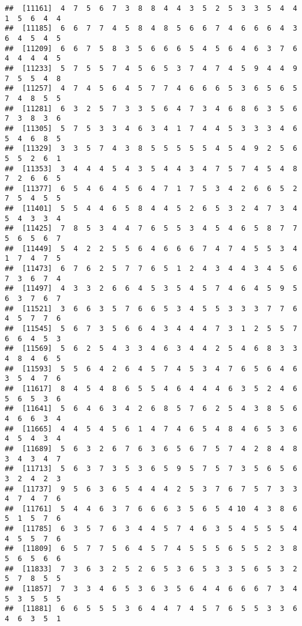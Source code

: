 \documentclass[
]{book}
\begin{document}
\begin{verbatim}
##  [11161]  4  7  5  6  7  3  8  8  4  4  3  5  2  5  3  3  5  4  4  1  5  6  4  4
##  [11185]  6  6  7  7  4  5  8  4  8  5  6  6  7  4  6  6  6  4  3  6  4  5  4  5
##  [11209]  6  6  7  5  8  3  5  6  6  6  5  4  5  6  4  6  3  7  6  4  4  4  4  5
##  [11233]  5  7  5  5  7  4  5  6  5  3  7  4  7  4  5  9  4  4  9  7  5  5  4  8
##  [11257]  4  7  4  5  6  4  5  7  7  4  6  6  6  5  3  6  5  6  5  7  4  8  5  5
##  [11281]  6  3  2  5  7  3  3  5  6  4  7  3  4  6  8  6  3  5  6  7  3  8  3  6
##  [11305]  5  7  5  3  3  4  6  3  4  1  7  4  4  5  3  3  3  4  6  5  4  6  8  5
##  [11329]  3  3  5  7  4  3  8  5  5  5  5  5  4  5  4  9  2  5  6  5  5  2  6  1
##  [11353]  3  4  4  4  5  4  3  5  4  4  3  4  7  5  7  4  5  4  8  7  2  6  6  5
##  [11377]  6  5  4  6  4  5  6  4  7  1  7  5  3  4  2  6  6  5  2  7  5  4  5  5
##  [11401]  5  5  4  4  6  5  8  4  4  5  2  6  5  3  2  4  7  3  4  5  4  3  3  4
##  [11425]  7  8  5  3  4  4  7  6  5  5  3  4  5  4  6  5  8  7  7  5  6  5  6  7
##  [11449]  5  4  2  2  5  5  6  4  6  6  6  7  4  7  4  5  5  3  4  1  7  4  7  5
##  [11473]  6  7  6  2  5  7  7  6  5  1  2  4  3  4  4  3  4  5  6  7  3  6  7  4
##  [11497]  4  3  3  2  6  6  4  5  3  5  4  5  7  4  6  4  5  9  5  6  3  7  6  7
##  [11521]  3  6  6  3  5  7  6  6  5  3  4  5  5  3  3  3  7  7  6  4  5  7  7  6
##  [11545]  5  6  7  3  5  6  6  4  3  4  4  4  7  3  1  2  5  5  7  6  6  4  5  3
##  [11569]  5  6  2  5  4  3  3  4  6  3  4  4  2  5  4  6  8  3  3  4  8  4  6  5
##  [11593]  5  5  6  4  2  6  4  5  7  4  5  3  4  7  6  5  6  4  6  3  5  4  7  6
##  [11617]  8  4  5  4  8  6  5  5  4  6  4  4  4  6  3  5  2  4  6  5  6  5  3  6
##  [11641]  5  6  4  6  3  4  2  6  8  5  7  6  2  5  4  3  8  5  6  4  6  6  3  4
##  [11665]  4  4  5  4  5  6  1  4  7  4  6  5  4  8  4  6  5  3  6  4  5  4  3  4
##  [11689]  5  6  3  2  6  7  6  3  6  5  6  7  5  7  4  2  8  4  8  3  4  3  4  7
##  [11713]  5  6  3  7  3  5  3  6  5  9  5  7  5  7  3  5  6  5  6  3  2  4  2  3
##  [11737]  9  5  6  3  6  5  4  4  4  2  5  3  7  6  7  5  7  3  3  4  7  4  7  6
##  [11761]  5  4  4  6  3  7  6  6  6  3  5  6  5  4 10  4  3  8  6  5  1  5  7  6
##  [11785]  6  3  5  7  6  3  4  4  5  7  4  6  3  5  4  5  5  5  4  4  5  5  7  6
##  [11809]  6  5  7  7  5  6  4  5  7  4  5  5  5  6  5  5  2  3  8  5  6  5  6  6
##  [11833]  7  3  6  3  2  5  2  6  5  3  6  5  3  3  5  6  5  3  2  5  7  8  5  5
##  [11857]  7  3  3  4  6  5  3  6  3  5  6  4  4  6  6  6  7  3  4  5  3  5  5  5
##  [11881]  6  6  5  5  5  3  6  4  4  7  4  5  7  6  5  5  3  3  6  4  6  3  5  1

\end{verbatim}
\end{document}

